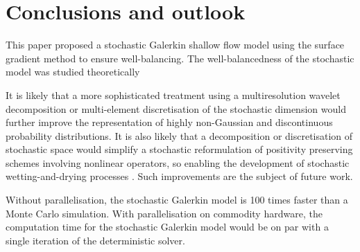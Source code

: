 \section{Conclusions and outlook}

This paper proposed a stochastic Galerkin shallow flow model using the surface gradient method to ensure well-balancing.
The well-balancedness of the stochastic model was studied theoretically 

It is likely that a more sophisticated treatment using a multiresolution wavelet decomposition \citep{lemaitre2004a,pettersson2014} or multi-element discretisation of the stochastic dimension \citep{wan-karniadakis2006,li-stinis2015} would further improve the representation of highly non-Gaussian and discontinuous probability distributions.
It is also likely that a decomposition or discretisation of stochastic space would simplify a stochastic reformulation of positivity preserving schemes involving nonlinear operators, so enabling the development of stochastic wetting-and-drying processes .
Such improvements are the subject of future work.

Without parallelisation, the stochastic Galerkin model is  100 times faster than a Monte Carlo simulation.
With parallelisation on commodity hardware, the computation time for the stochastic Galerkin model would be on par with a single iteration of the deterministic solver.




